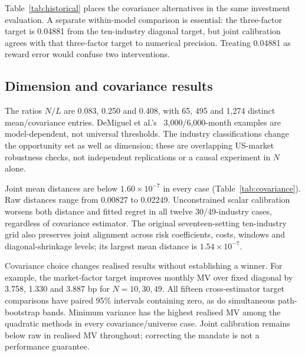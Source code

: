 \documentclass[sigconf,anonymous,review]{acmart}
\begin{document}
Table~\ref{tab:historical} places the covariance alternatives in the same investment evaluation. A separate within-model comparison is essential: the three-factor target is 0.04881 from the ten-industry diagonal target, but joint calibration agrees with that three-factor target to numerical precision. Treating 0.04881 as reward error would confuse two interventions.

\subsection{Dimension and covariance results}
The ratios $N/L$ are 0.083, 0.250 and 0.408, with 65, 495 and 1,274 distinct mean/covariance entries. DeMiguel et al.'s~\cite{demiguel2009} 3,000/6,000-month examples are model-dependent, not universal thresholds. The industry classifications change the opportunity set as well as dimension; these are overlapping US-market robustness checks, not independent replications or a causal experiment in $N$ alone.

\begin{table}[t]
\centering
\caption{Within-estimator fidelity and own-state performance across all eighteen covariance/universe cases. Distances use each estimator's own fitted reference. Joint calibration agrees with it; minimum variance generally represents a different preference. Monthly MV scores are in basis-point units.}
\label{tab:covariance}

\end{table}

Joint mean distances are below $1.60\times10^{-7}$ in every case (Table~\ref{tab:covariance}). Raw distances range from 0.00827 to 0.02249. Unconstrained scalar calibration worsens both distance and fitted regret in all twelve 30/49-industry cases, regardless of covariance estimator. The original seventeen-setting ten-industry grid also preserves joint alignment across risk coefficients, costs, windows and diagonal-shrinkage levels; its largest mean distance is $1.54\times10^{-7}$.

Covariance choice changes realised results without establishing a winner. For example, the market-factor target improves monthly MV over fixed diagonal by 3.758, 1.330 and 3.887 bp for $N=10,30,49$. All fifteen cross-estimator target comparisons have paired 95\% intervals containing zero, as do simultaneous path-bootstrap bands. Minimum variance has the highest realised MV among the quadratic methods in every covariance/universe case. Joint calibration remains below raw in realised MV throughout; correcting the mandate is not a performance guarantee.
\end{document}
